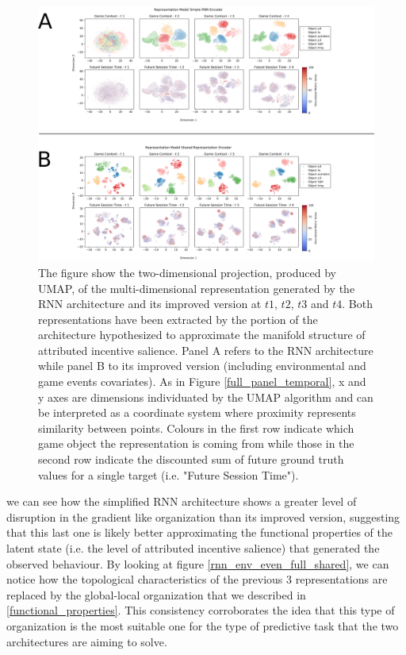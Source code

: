 \begin{figure}[ht]
\centering
\includegraphics[width=\textwidth]{images/chapter_4/rnn_predictive.png}
\caption[\textbf{Differences in predictive power between the representations generated by the RNN architecture and its improved version}]{The figure show the two-dimensional projection, produced by UMAP, of the multi-dimensional representation generated by the RNN architecture and its improved version at $t1$, $t2$, $t3$ and $t4$. Both representations have been extracted by the portion of the architecture hypothesized to approximate the manifold structure of attributed incentive salience. Panel A refers to the RNN architecture while panel B to its improved version (including environmental and game events covariates). As in Figure \ref{full_panel_temporal}, x and y axes are dimensions individuated by the UMAP algorithm and can be interpreted as a coordinate system where proximity represents similarity between points. Colours in the first row indicate which game object the representation is coming from while those in the second row indicate the discounted sum of future ground truth values for a single target (i.e. "Future Session Time").}
\label{rnn_predictive_comparison}
\end{figure}

we can see how the simplified RNN architecture shows a greater level of disruption in the gradient like organization than its improved version, suggesting that this last one is likely better approximating the functional properties of the latent state (i.e. the level of attributed incentive salience) that generated the observed behaviour. By looking at figure \ref{rnn_env_even_full_shared}, we can notice how the topological characteristics of the previous 3 representations are replaced by the global-local organization that we described in \ref{functional_properties}. This consistency corroborates the idea that this type of organization is the most suitable one for the type of predictive task that the two architectures are aiming to solve.

